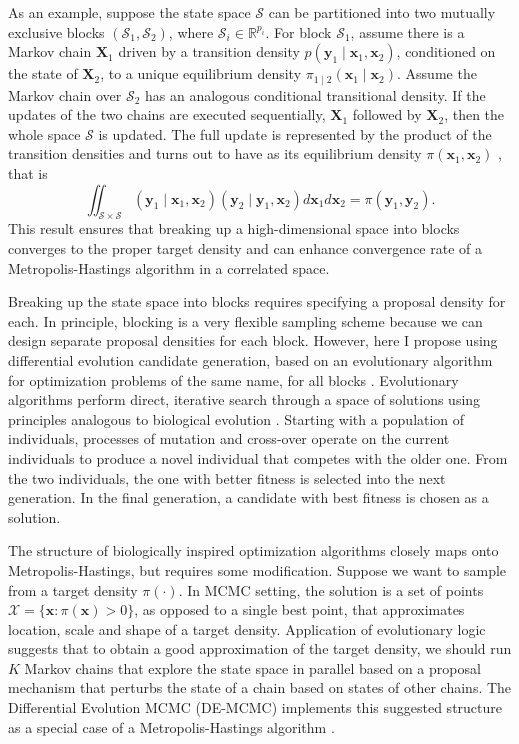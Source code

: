 \documentclass[12pt]{report}
\begin{document}
As an example, suppose the state space $\mathcal{S}$ can be partitioned into two mutually exclusive blocks $(\mathcal{S}_1, \mathcal{S}_2)$, where $\mathcal{S}_i \in \mathbb{R}^{p_i}$. For block $\mathcal{S}_1$, assume there is a Markov chain $\boldsymbol{X}_1$ driven by a transition density $p(\boldsymbol{y}_1 \mid \boldsymbol{x}_1, \boldsymbol{x}_2)$, conditioned on the state of $\boldsymbol{X}_2$, to a unique equilibrium density $\pi_{1 \mid 2}(\boldsymbol{x}_1 \mid \boldsymbol{x}_2)$. Assume the Markov chain over $\mathcal{S}_2$ has an analogous conditional transitional density. If the updates of the two chains are executed sequentially, $\boldsymbol{X}_1$ followed by $\boldsymbol{X}_2$, then the whole space $\mathcal{S}$ is updated. The full update is represented by the product of the transition densities and turns out to have as its equilibrium density $\pi(\boldsymbol{x}_1, \boldsymbol{x}_2)$ \citep{RobCas2004,GivHoe2012}, that is
\begin{equation}
\iint_{\mathcal{S}\times\mathcal{S}} (\boldsymbol{y}_1 \mid \boldsymbol{x}_1, \boldsymbol{x}_2)(\boldsymbol{y}_2 \mid \boldsymbol{y}_1, \boldsymbol{x}_2)d\boldsymbol{x}_1d\boldsymbol{x}_2 = \pi(\boldsymbol{y}_1,\boldsymbol{y}_2).
\end{equation}
This result ensures that breaking up a high-dimensional space into blocks converges to the proper target density and can enhance convergence rate of a Metropolis-Hastings algorithm in a correlated space.

Breaking up the state space into blocks requires specifying a proposal density for each. In principle, blocking is a very flexible sampling scheme because we can design separate proposal densities for each block. However, here I propose using differential evolution candidate generation, based on an evolutionary algorithm for optimization problems of the same name, for all blocks \citep{StoPri1997,Ter2006,TurSed2013}. Evolutionary algorithms perform direct, iterative search through a space of solutions using principles analogous to biological evolution \citep{Sim2013}. Starting with a population of individuals, processes of mutation and cross-over operate on the current individuals to produce a novel individual that competes with the older one. From the two individuals, the one with better fitness is selected into the next generation. In the final generation, a candidate with best fitness is chosen as a solution.  

The structure of biologically inspired optimization algorithms closely maps onto Metropolis-Hastings, but requires some modification. Suppose we want to sample from a target density $\pi(\cdot)$. In MCMC setting, the solution is a set of points $\mathcal{X} = \{\boldsymbol{x} : \pi(\boldsymbol{x}) > 0\}$, as opposed to a single best point, that approximates location, scale and shape of a target density. Application of evolutionary logic suggests that to obtain a good approximation of the target density, we should run $K$ Markov chains that explore the state space in parallel based on a proposal mechanism that perturbs the state of a chain based on states of other chains. The Differential Evolution MCMC (DE-MCMC) implements this suggested structure as a special case of a Metropolis-Hastings algorithm \citep{Ter2006,TurSed2013}.
\end{document}
